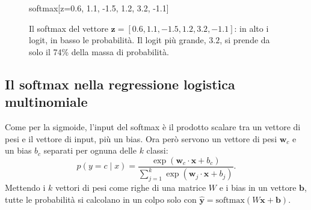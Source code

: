 \begin{figure}[htbp]
\centering
\begin{widget}{softmax}[z={0.6, 1.1, -1.5, 1.2, 3.2, -1.1}]
\end{widget}
\caption{Il softmax del vettore $\mathbf{z} = [0.6, 1.1, -1.5, 1.2, 3.2, -1.1]$: in alto i logit, in basso le probabilità. Il logit più grande, $3.2$, si prende da solo il 74\% della massa di probabilità.}
\label{fig:softmax}
\end{figure}

\subsection{Il softmax nella regressione logistica multinomiale}
Come per la sigmoide, l'input del softmax è il prodotto scalare tra un vettore di pesi e il vettore di input, più un bias. Ora però servono un vettore di pesi $\mathbf{w}_c$ e un bias $b_c$ separati per ognuna delle $k$ classi:
\begin{equation}
p(y = c \mid x) = \frac{\exp(\mathbf{w}_c \cdot \mathbf{x} + b_c)}{\sum_{j=1}^{k} \exp(\mathbf{w}_j \cdot \mathbf{x} + b_j)}.
\end{equation}
Mettendo i $k$ vettori di pesi come righe di una matrice $W$ e i bias in un vettore $\mathbf{b}$, tutte le probabilità si calcolano in un colpo solo con $\hat{\mathbf{y}} = \mathrm{softmax}(W\mathbf{x} + \mathbf{b})$.


